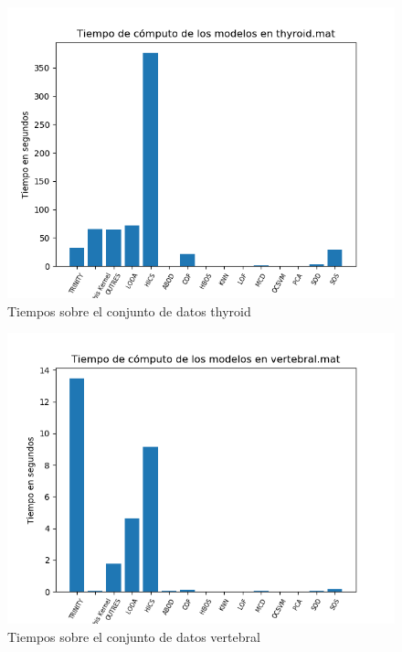 \begin{figure}[H]
	\centering
	\label{thyroid_times}
	\includegraphics[scale=0.7]{imagenes/imgs-exp1/times/thyroid}
	\caption{Tiempos sobre el conjunto de datos thyroid}
\end{figure}

\begin{figure}[H]
	\centering
	\label{vertebral_times}
	\includegraphics[scale=0.7]{imagenes/imgs-exp1/times/vertebral}
	\caption{Tiempos sobre el conjunto de datos vertebral}
\end{figure}

